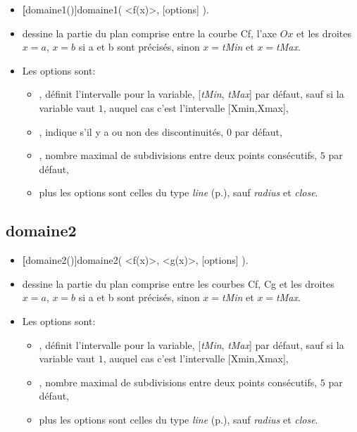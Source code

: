 \begin{itemize}
 \item \util \textbf[domaine1()]{domaine1( <f(x)>, [options] )}.
 \item \desc dessine la partie du plan comprise entre la courbe Cf, l'axe $Ox$ et les droites $x=a$, $x=b$ si a et b sont précisés, sinon $x=$\textsl{tMin} et $x=$\textsl{tMax}.
 \item Les options sont:
  \begin{itemize}
  \item {}, définit l'intervalle pour la variable, [\emph{tMin}, \emph{tMax}] par défaut, sauf si la variable  vaut $1$, auquel cas c'est l'intervalle [Xmin,Xmax],
  \item {}, indique s'il y a ou non des discontinuités, $0$ par défaut,
  \item {}, nombre maximal de subdivisions entre deux points consécutifs, $5$ par défaut,
  \item plus les options sont celles du type \emph{line} (p.\pageref{typeline}), sauf \emph{radius} et \emph{close}.
  \end{itemize}
\end{itemize}


\subsection{domaine2}

\begin{itemize}
 \item \util \textbf[domaine2()]{domaine2( <f(x)>, <g(x)>, [options] )}.
 \item \desc dessine la partie du plan comprise entre les courbes Cf, Cg et les droites $x=a$, $x=b$ si a et b sont
précisés, sinon $x=$\textsl{tMin} et $x=$\textsl{tMax}.
 \item Les options sont:
  \begin{itemize}
  \item {}, définit l'intervalle pour la variable, [\emph{tMin}, \emph{tMax}] par défaut, sauf si la variable  vaut $1$, auquel cas c'est l'intervalle [Xmin,Xmax],
  \item {}, nombre maximal de subdivisions entre deux points consécutifs, $5$ par défaut,
  \item plus les options sont celles du type \emph{line} (p.\pageref{typeline}), sauf \emph{radius} et \emph{close}.
  \end{itemize}
\end{itemize}


